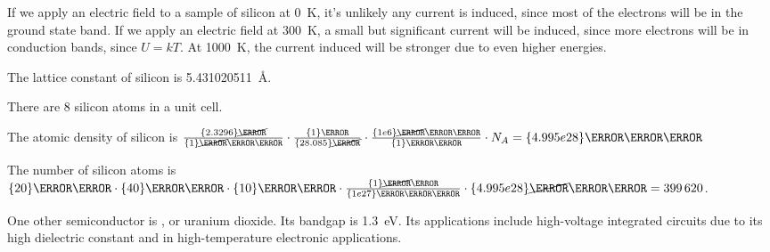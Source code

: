 \documentclass{article}
\begin{document}
\question{}

If we apply an electric field to a sample of silicon at \qty{0}{\kelvin}, it's unlikely any current is induced, since most of the electrons will be in the ground state band.
If we apply an electric field at \qty{300}{\kelvin}, a small but significant current will be induced, since more electrons will be in conduction bands, since \(U = kT\).
At \qty{1000}{\kelvin}, the current induced will be stronger due to even higher energies.

\question{}

\begin{subparts}
  \item The lattice constant of silicon is \qty{5.431020511}{\angstrom}.
  \item There are \(8\) silicon atoms in a unit cell.
  \item The atomic density of silicon is \(\frac{\qty{2.3296}{\cancel\gram}}{\qty{1}{\cancel\centi\meter\cubed}} \cdot \frac{\qty{1}{\mole}}{\qty{28.085}{\cancel\gram}} \cdot \frac{\qty{1e6}{\cancel\centi\meter\cubed}}{\qty{1}{\meter\cubed}} \cdot N_A = \qty{4.995e28}{\per\meter\cubed}\)
  \item The number of silicon atoms is \(\qty{20}{\nano\meter} \cdot \qty{40}{\nano\meter} \cdot \qty{10}{\nano\meter} \cdot \frac{\qty{1}{\cancel\meter\cubed}}{\qty{1e27}{\nano\meter\cubed}} \cdot \qty{4.995e28}{\cancel\per\meter\cubed} = \num{399620}\).
\end{subparts}

\question{}

One other semiconductor is , or uranium dioxide.
Its bandgap is \qty{1.3}{\electronvolt}.
Its applications include high-voltage integrated circuits due to its high dielectric constant and in high-temperature electronic applications.
\end{document}
